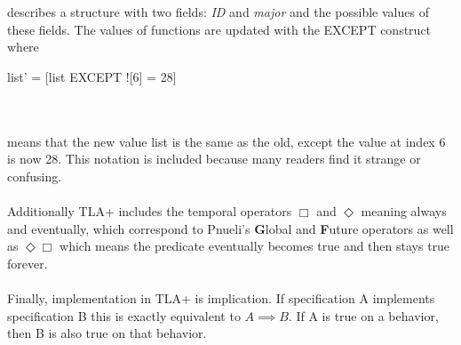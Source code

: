 \documentclass{uit-thesis}
\begin{document}
\\\\
describes a structure with two fields: \textit{ID} and \textit{major} and the possible values of these fields. The values of functions are updated with the EXCEPT construct where 
\begin{tla}
    list' = [list EXCEPT ![6] = 28]
\end{tla}
\begin{tlatex}
%
\end{tlatex}
\\\\
means that the new value list is the same as the old, except the value at index 6 is now 28. This notation is included because many readers find it strange or confusing.
\\\\
Additionally TLA+ includes the temporal operators $\Box$ and $\Diamond$ meaning always and eventually, which correspond to Pnueli's \textbf{G}lobal and \textbf{F}uture operators as well as $\Diamond\Box$ which means the predicate eventually becomes true and then stays true forever.
\\\\
Finally, implementation in TLA+ is implication. If specification A implements specification B this is exactly equivalent to $A \implies B$. If A is true on a behavior, then B is also true on that behavior.
\end{document}
